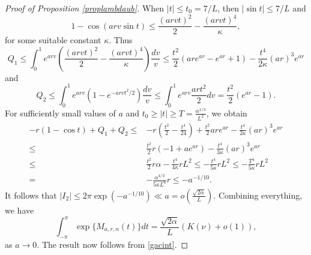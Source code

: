\documentclass[10pt,a4paper]{amsart}
\begin{document}
\begin{proof}[Proof of Proposition \ref{proplambdaub}]
When $|t| \le t_0 = 7/L$, then $|\sin t| \le 7/L$ and 
$$
1-\cos(arv \sin t) \le \frac{(arv t)^2}{2}- \frac{(arvt)^4}{\kappa},
$$
for some suitable constant $\kappa$. Thus 
$$
Q_1 \le \int_0^1 e^{arv} \left(\frac{(arv  t)^2}{2} -\frac{(arvt)^4}{\kappa}\right) \frac{dv}{v}
\le  \frac{t^2}{2} \left( ar e^{ar} - e^{ar}+1\right)- \frac{t^4}{2\kappa} (ar)^3 e^{ar}
$$
and
$$
Q_2 \le \int_0^{1} e^{arv}( 1-e^{-arv t^2/2})  \frac{dv}{v} \le  \int_0^{1} e^{arv} \frac{ar t^2}{2} dv = \frac{t^2}{2} (e^{ar}-1).
$$
For sufficiently small values of $a$ and  $t_0\ge |t| \ge T = \frac{\alpha^{1/3}}{L^2}$, we obtain
\begin{equation*}
\begin{split}
  -r(1-\cos t) + Q_1+Q_2 
 \le & -r\left(\frac{ t^2}{2}-\frac{t^4}{24}\right)+ \frac{t^2}{2} ar e^{ar}  - \frac{t^4}{2\kappa} (ar)^3 e^{ar}\\
\le & \frac{t^2}{2} r \left(-1 + a e^{ar} \right) - \frac{t^4}{3\kappa} (ar)^3 e^{ar}\\
 \le & \frac{t^2}{2} r \alpha - \frac{t^4}{4\kappa} r L^2 
\le  - \frac{t^4}{5\kappa} r   L^2 
\le  -\frac{T^4}{5\kappa} r   L^2 \\
= &  -\frac{\alpha^{4/3}}{5\kappa L^6} r \le - a^{-1/10}.
\end{split}
\end{equation*}
It follows that 
$
|I_2| \le 2 \pi \exp(- a^{-1/10}) \ll a  = o\left(\frac{\sqrt{2\alpha}}{L} \right).
$
Combining everything, we have 
$$
  \int_{-\pi}^\pi \exp\{ M_{a,r,n}(t) \} dt = \frac{\sqrt{2\alpha}}{L} ( K(\nu) + o(1)),
$$
as $a \to 0$. 
The result now follows from \eqref{gacint}.
\end{proof}
\end{document}
